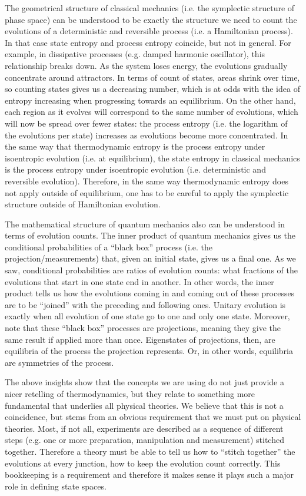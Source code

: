 \documentclass[letterpaper,twocolumn]{article}
\begin{document}
The geometrical structure of classical mechanics (i.e. the symplectic structure of phase space) can be understood to be exactly the structure we need to count the evolutions of a deterministic and reversible process (i.e. a Hamiltonian process). In that case state entropy and process entropy coincide, but not in general. For example, in dissipative processes (e.g. damped harmonic oscillator), this relationship breaks down. As the system loses energy, the evolutions gradually concentrate around attractors. In terms of count of states, areas shrink over time, so counting states gives us a decreasing number, which is at odds with the idea of entropy increasing when progressing towards an equilibrium. On the other hand, each region as it evolves will correspond to the same number of evolutions, which will now be spread over fewer states: the process entropy (i.e. the logarithm of the evolutions per state) increases as evolutions become more concentrated. In the same way that thermodynamic entropy is the process entropy under isoentropic evolution (i.e. at equilibrium), the state entropy in classical mechanics is the process entropy under isoentropic evolution (i.e. deterministic and reversible evolution). Therefore, in the same way thermodynamic entropy does not apply outside of equilibrium, one has to be careful to apply the symplectic structure outside of Hamiltonian evolution.

The mathematical structure of quantum mechanics also can be understood in terms of evolution counts. The inner product of quantum mechanics gives us the conditional probabilities of a ``black box'' process (i.e. the projection/measurements) that, given an initial state, gives us a final one. As we saw, conditional probabilities are ratios of evolution counts: what fractions of the evolutions that start in one state end in another. In other words, the inner product tells us how the evolutions coming in and coming out of these processes are to be ``joined'' with the preceding and following ones.  Unitary evolution is exactly when all evolution of one state go to one and only one state.  Moreover, note that these ``black box'' processes are projections, meaning they give the same result if applied more than once. Eigenstates of projections, then, are equilibria of the process the projection represents. Or, in other words, equilibria are symmetries of the process.

The above insights show that the concepts we are using do not just provide a nicer retelling of thermodynamics, but they relate to something more fundamental that underlies all physical theories. We believe that this is not a coincidence, but stems from an obvious requirement that we must put on physical theories. Most, if not all, experiments are described as a sequence of different steps (e.g. one or more preparation, manipulation and measurement) stitched together. Therefore a theory must be able to tell us how to ``stitch together'' the evolutions at every junction, how to keep the evolution count correctly. This bookkeeping is a requirement and therefore it makes sense it plays such a major role in defining state spaces.
\end{document}
